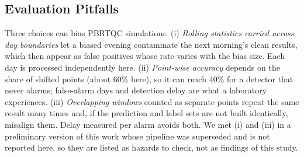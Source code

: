 \documentclass[conference]{IEEEtran}
\begin{document}
\subsection{Evaluation Pitfalls}
Three choices can bias PBRTQC simulations. (i) \emph{Rolling statistics carried across day boundaries} let a biased evening contaminate the next morning's clean results, which then appear as false positives whose rate varies with the bias size. Each day is processed independently here. (ii) \emph{Point-wise accuracy} depends on the share of shifted points (about 60\% here), so it can reach 40\% for a detector that never alarms; false-alarm days and detection delay are what a laboratory experiences. (iii) \emph{Overlapping windows} counted as separate points repeat the same result many times and, if the prediction and label sets are not built identically, misalign them. Delay measured per alarm avoids both. We met (i) and (iii) in a preliminary version of this work whose pipeline was superseded and is not reported here, so they are listed as hazards to check, not as findings of this study.
\end{document}
